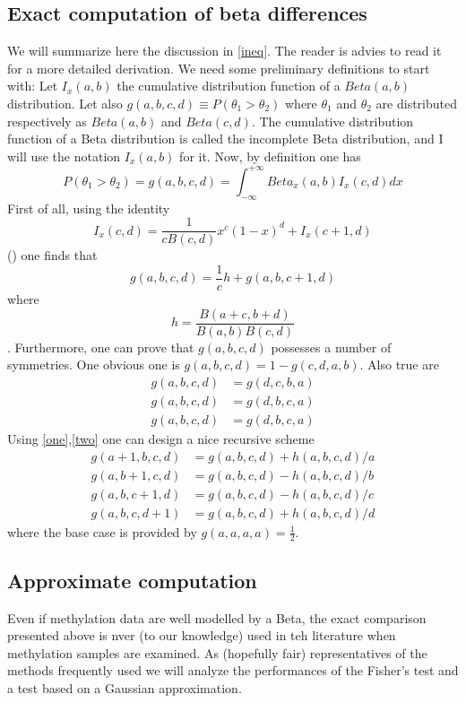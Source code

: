 \documentclass[11pt]{amsart}
\begin{document}
\subsection{Exact computation of beta differences}
We will summarize here the discussion in \ref{ineq}. The reader is advies to read it for a more detailed derivation.
We need some preliminary definitions to start with:
Let $I_x(a,b)$ the cumulative distribution function of a $Beta(a,b)$ distribution. Let also $g(a,b,c,d) \equiv P(\theta_1>\theta_2)$ where $\theta_1$ and $\theta_2$ are distributed respectively as $Beta(a,b)$ and $Beta(c,d)$. The cumulative distribution function of a Beta distribution is called the incomplete Beta distribution, and I will use the notation $I_x(a,b)$ for it. Now, by definition one has \[P(\theta_1>\theta_2)=g(a,b,c,d)=\int_{-\infty}^{+\infty} Beta_x(a,b)I_x(c,d) dx\]
First of all,  using the identity \[I_x(c,d)=\frac{1}{cB(c,d)}x^c(1-x)^d+I_x(c+1,d)\] (\cite{abramowitz}) one finds that 
\[g(a,b,c,d)=\frac{1}{c}h+g(a,b,c+1,d)\]\label{one} where \[h=\frac{B(a+c,b+d)}{B(a,b)B(c,d)}\].
Furthermore, one can prove that $g(a,b,c,d)$ possesses a number of symmetries.
One obvious one is $g(a,b,c,d)=1-g(c,d,a,b)$. Also true are 
\begin{align*}\label{two}
g(a,b,c,d)&=g(d,c,b,a) \\
g(a,b,c,d)&=g(d,b,c,a) \\
g(a,b,c,d)&=g(d,b,c,a) 
\end{align*}
Using \ref{one},\ref{two} one can design a nice recursive scheme
\begin{align*}
g(a+1,b,c,d) &= g(a,b,c,d) + h(a,b,c,d)/a \\
g(a,b+1,c,d) &= g(a,b,c,d) - h(a,b,c,d)/b \\
g(a,b,c+1,d) &= g(a,b,c,d) - h(a,b,c,d)/c \\
g(a,b,c,d+1) &= g(a,b,c,d) + h(a,b,c,d)/d 
\end{align*}
where the base case is provided by $g(a,a,a,a)=\frac{1}{2}$.
\subsection{Approximate computation}
Even if methylation data are well modelled by a Beta, the exact comparison presented above is nver (to our knowledge) used in teh literature when methylation samples are examined. As (hopefully fair) representatives of the methods frequently used we will analyze the performances of the Fisher's test and a test based on a Gaussian approximation.
\end{document}
